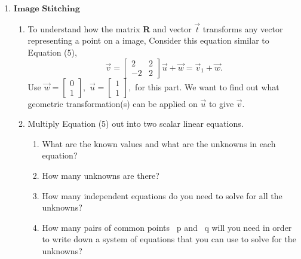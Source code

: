 \documentclass[11pt]{article}
\begin{document}
\begin{enumerate}
\begin{enumerate}
         
        
         
        
         
   \end{enumerate}
   \newpage
   \item $\textbf{Image Stitching}$
       \begin{enumerate}
           \item To understand how the matrix \textbf{R} and vector $\vec t$ transforms any vector representing a point on a image,
            Consider this equation similar to Equation (5),
                \[
                	\vec v = \begin{bmatrix}
                    		    2 & 2 \\
                			   -2 & 2
                	\end{bmatrix} \vec u + \vec w 
                    = \vec v_1 + \vec w.
                \]
                Use $\vec w = \begin{bmatrix}
                				0 \\
                				1
                            \end{bmatrix},
                    $
                    $\vec u = \begin{bmatrix}
                				1 \\
                				1
                            \end{bmatrix},$
                            for this part.
                We want to find out what geometric transformation(s) can be applied on $\vec u$ to give $\vec v$.
            \item Multiply Equation (5) out into two scalar linear equations.
            
            \begin{enumerate}
                \item What are the known values and what are the unknowns in each equation?
                \item How many unknowns are there?
                \item How many independent equations do you need to solve for all the unknowns?
                \item How many pairs of common points ~p and ~q will you need in order to write down a system of equations that you can use to solve for the unknowns?
            \end{enumerate}
            

\end{enumerate}
\end{enumerate}
\end{document}
